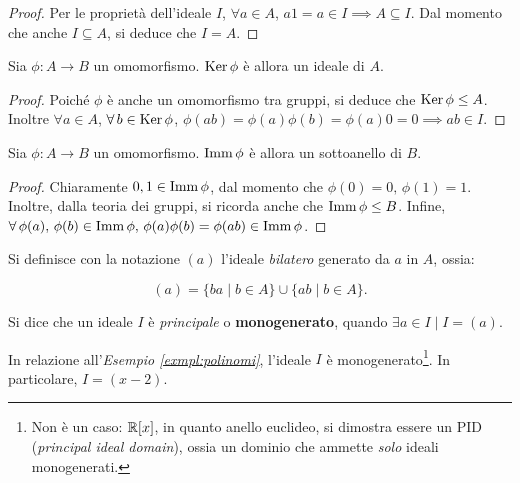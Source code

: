 \begin{proof}
    Per le proprietà dell'ideale $I$, $\forall a \in A$, $a1 = a \in I \implies
        A \subseteq I$. Dal momento che anche $I \subseteq A$, si deduce che $I = A$.
\end{proof}

\begin{proposition}
    Sia $\phi : A \to B$ un omomorfismo. $\operatorname{Ker} \phi$ è allora un ideale di $A$.
\end{proposition}

\begin{proof}
    Poiché $\phi$ è anche un omomorfismo tra gruppi, si deduce che $\operatorname{Ker} \phi \leq A$.
    Inoltre $\forall a \in A$, $\forall b \in \Ker \phi$, $\phi(ab)=\phi(a)\phi(b)=\phi(a)0=0 \implies ab \in I$.
\end{proof}

\begin{proposition}
    Sia $\phi : A \to B$ un omomorfismo. $\operatorname{Imm} \phi$ è allora un sottoanello di $B$.
\end{proposition}

\begin{proof}
    Chiaramente $0, 1 \in \operatorname{Imm} \phi$, dal momento che $\phi(0) = 0,\, \phi(1)=1$. Inoltre, dalla teoria dei gruppi, si ricorda anche che $\operatorname{Imm} \phi \leq B$.
    Infine, $\forall \phi(a),\, \phi(b) \in \Imm \phi, \, \phi(a)\phi(b) = \phi(ab) \in \Imm \phi$.
\end{proof}

\begin{definition}
    Si definisce con la notazione $(a)$ l'ideale \textit{bilatero} generato da $a$ in $A$, ossia:

    \[(a)=\{ba \mid b \in A\} \cup \{ab \mid b \in A\}.\]
\end{definition}

\begin{definition}
    Si dice che un ideale $I$ è \textit{principale} o \textbf{monogenerato}, quando $\exists a \in I \mid I = (a)$.
\end{definition}

\begin{example}
    In relazione all'\textit{Esempio \ref{exmpl:polinomi}}, l'ideale $I$ è
    monogenerato\footnote{Non è un caso: $\mathbb R[x]$, in quanto anello euclideo, si dimostra essere un PID (\textit{principal ideal domain}), ossia un dominio che ammette \textit{solo} ideali monogenerati.}. In particolare, $I=(x-2)$.
\end{example}


